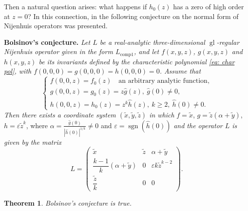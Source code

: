 \documentclass[12pt]{article}
\theoremstyle{plain}
\newtheorem{Theorem}{Theorem}
\begin{document}
Then a natural question arises: what happens if $h_0(z)$ has a zero of high order at $z=0$? In this connection, in \cite{bkm} the following conjecture on the normal form of Nijenhuis operators was presented.

\textbf{Bolsinov's conjecture.}
\textit{Let $L$ be a real-analytic three-dimensional $\operatorname{gl}$-regular Nijenhuis operator given in the form $L_{\operatorname{comp1}}$, and let $f(x,y,z)$, $g(x,y,z)$ and $h(x,y,z)$ be its invariants defined by the characteristic polynomial \eqref{eq: char pol}, with $f(0,0,0) = g(0,0,0) = h(0,0,0) = 0$. 
    Assume that }
    $$
    \begin{cases}
      f(0,0,z) = f_0(z) \quad \text{an arbitrary analytic function,} \\
      g(0,0,z) = g_0(z) = z \hat{g}(z), \ \hat{g}(0) \neq 0, \\
      h(0,0,z) = h_0(z) = z^k \hat{h}(z), \ k \geq 2, \ \hat{h}(0) \neq 0. 
    \end{cases}
    $$
  \textit{Then there exists a coordinate system $(\tilde{x},\tilde{y},\tilde{z})$ in which } $ f = \tilde{x}$, $g = \tilde{z}(\alpha + \tilde{y})$, $ h = \varepsilon \tilde{z}^k$, where $\alpha = \frac{\hat{g}(0)}{|\hat{h}(0)|^{1/k}} \neq 0$ and $\varepsilon = \operatorname{sgn}(\hat{h}(0))$ \textit{and the operator $L$ is given by the matrix}
    \begin{equation}
        L = \begin{pmatrix}
            \tilde{x} & \tilde{z} & \alpha +\tilde{y} \\[2pt]
            \dfrac{k-1}{k}(\alpha +\tilde{y}) & 0 & \varepsilon k\tilde{z}^{k-2} \\[6pt]
            \dfrac{\tilde{z}}{k} & 0 & 0
        \end{pmatrix}.
    \end{equation}

\begin{Theorem}
    Bolsinov's conjecture is true.
\end{Theorem}
\end{document}

